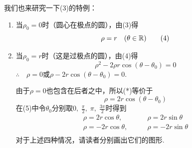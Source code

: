 我们也来研究一下(3)的特例：
\begin{enumerate}
    \item 当$\rho_0=0$时（圆心在极点的圆），由(3)得
\begin{equation}
    \rho =r\quad (\theta\in\mathbb{R}) \tag{4}    
\end{equation}
    \item 当$\rho_0=r$时（这是过极点的圆），由(4)得
\begin{equation}
    \rho^2-2\rho r\cos(\theta-\theta_0)=0  \tag{*}    
\end{equation}
$\therefore\quad \rho=0$或$\rho-2r\cos(\theta-\theta_0)=0$.


由于$\rho=0$也包含在后者之中，所以(*)等价于
\begin{equation}
\rho=2r\cos(\theta-\theta_0)  \tag{5}
\end{equation}
在(5)中令$\theta_0$分别取$0,\; \frac{\pi}{2},\; \pi,\; \frac{3\pi}{2}$时得到
\begin{equation}
    \begin{split}
        \rho=2r\cos\theta,&\qquad  \rho=2r\sin\theta\\
        \rho=-2r\cos\theta,&\qquad  \rho=-2r\sin\theta\\
    \end{split}\tag{2}
    \end{equation}
对于上述四种情况，请读者分别画出它们的图形.
\end{enumerate}

